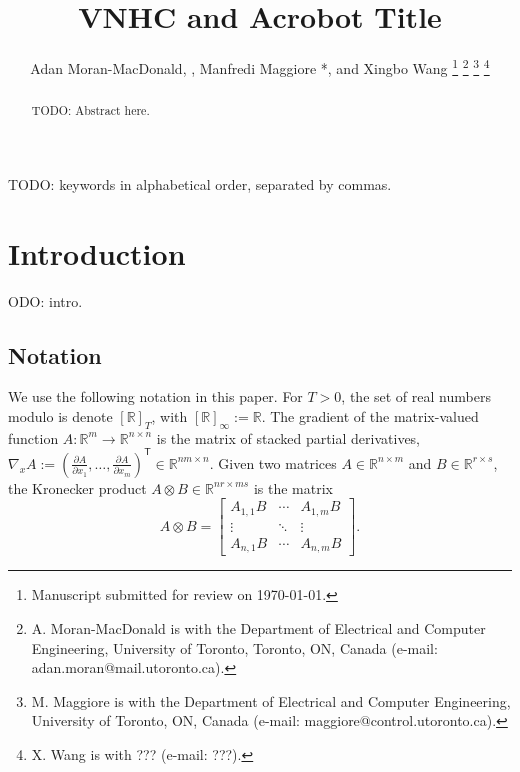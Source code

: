 \documentclass[journal,twoside,web]{ieeecolor}
\newcommand*{\Title}{VNHC and Acrobot Title}
\newcommand*{\tpose}{^\mathsf{T}}
\newcommand*{\Rt}[1]{[\R]_{#1}}
\newcommand*{\R}{\mathbb{R}}
\newcommand*{\pdiff}[2]{\frac{\partial #1}{\partial #2}}
\begin{document}
\title{\Title}
\author{Adan Moran-MacDonald, , Manfredi Maggiore
*, and Xingbo Wang
\thanks{Manuscript submitted for review on \today.}
\thanks{A. Moran-MacDonald is with the Department of Electrical and Computer
    Engineering, University of Toronto, Toronto, ON, Canada (e-mail:
adan.moran@mail.utoronto.ca).}
\thanks{M. Maggiore is with the Department of Electrical and Computer
Engineering, University of Toronto, ON, Canada (e-mail:
maggiore@control.utoronto.ca).}
\thanks{X. Wang is with ??? (e-mail: ???).}
} %

\maketitle

\begin{abstract}
TODO: Abstract here.
\end{abstract}

\begin{IEEEkeywords}
TODO: keywords in alphabetical order, separated by commas.
\end{IEEEkeywords}

\section{Introduction}\label{sec:introduction}
ODO: intro.

\subsection{Notation}
We use the following notation in this paper. 
For \(T > 0\), the set of real numbers modulo is denote \(\Rt{T}\), with
\(\Rt{\infty} := \R\).
The gradient of the matrix-valued function 
\(A : \R^m \rightarrow \R^{n\times n}\) is the matrix of stacked partial
derivatives, 
\(\nabla_xA := (\pdiff{A}{x_1},\ldots,\pdiff{A}{x_m})\tpose \in \R^{nm \times n}\).
Given two matrices \(A \in \R^{n \times m}\) and \(B \in \R^{r \times s}\), the
Kronecker product \cite{kronprod} \(A \otimes B \in \R^{nr \times ms}\) is the
matrix
\[
    A \otimes B = \begin{bmatrix}
        A_{1,1}B & \cdots & A_{1,m} B \\
        \vdots & \ddots & \vdots \\
        A_{n,1} B & \cdots & A_{n,m} B
    \end{bmatrix} 
    .
\]
\end{document}
